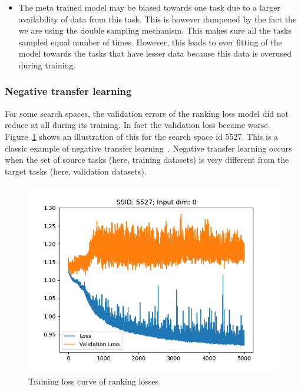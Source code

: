 \documentclass[12pt, twoside, ngerman]{report}
\begin{document}
\begin{itemize}
\item The meta trained model may be biased towards one task due to a larger availability of data from this task.
This is however dampened by the fact the we are using the double sampling mechanism.
This makes sure all the tasks sampled equal number of times.
However,  this leads to over fitting of the model towards the tasks that have lesser data because this data is overused during training.

\end{itemize}
    
\subsubsection{Negative transfer learning}
For some search spaces,  the validation errors of the ranking loss model did not reduce at all during its training.
In fact the validation loss became worse.
Figure~\ref{fig:NegativeLearning} shows an illustration of this for the search space id 5527.
This is a classic example of negative transfer learning~\cite{Weiss2016}.
Negative transfer learning occurs when the set of source tasks (here,  training datasets) is very different from the target tasks (here, validation datasets).

\begin{figure}[htb]
  \centering
    \includegraphics[scale=0.5]{images/NegativeLearning}
    \caption{Training loss curve of ranking losses}
    \label{fig:NegativeLearning}
\end{figure}
\end{document}

